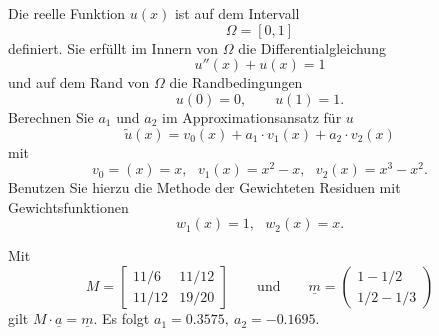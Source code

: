 Die reelle Funktion $u(x)$ ist auf dem Intervall
\[
\Omega = [0, 1]
\]
definiert. Sie erfüllt im Innern von $\Omega$ die Differentialgleichung
\[
u''(x) + u(x) = 1
\]
und auf dem Rand von $\Omega$ die Randbedingungen
\[
u(0) = 0, \qquad
u(1) = 1.
\]
Berechnen Sie $a_1$ und $a_2$ im Approximationsansatz für $u$
\[
\tilde u(x) = v_0(x) + a_1 \cdot v_1(x) + a_2 \cdot v_2(x)
\]
mit
\[
v_0=(x) = x, \ \ \ v_1(x) = x^2 - x, \ \ \ v_2(x) = x^3 - x^2.
\]
Benutzen Sie hierzu die Methode der Gewichteten Residuen mit Gewichtsfunktionen
\[
w_1(x) = 1, \ \ \ w_2(x) = x.
\]


\begin{loesung}
Mit 
\[
M
=
\left[
\begin{matrix}
11/6 & 11/12 \\
11/12 & 19/20
\end{matrix}
\right]
\qquad\text{und}\qquad
\underline{m}
=
\begin{pmatrix}
1 - 1/2  \\ 1/2 - 1/3
\end{pmatrix}
\]
gilt $M \cdot \underline{a} = \underline{m}$.
Es folgt $a_1 = 0.3575, \ a_2 = -0.1695$.
\end{loesung}


